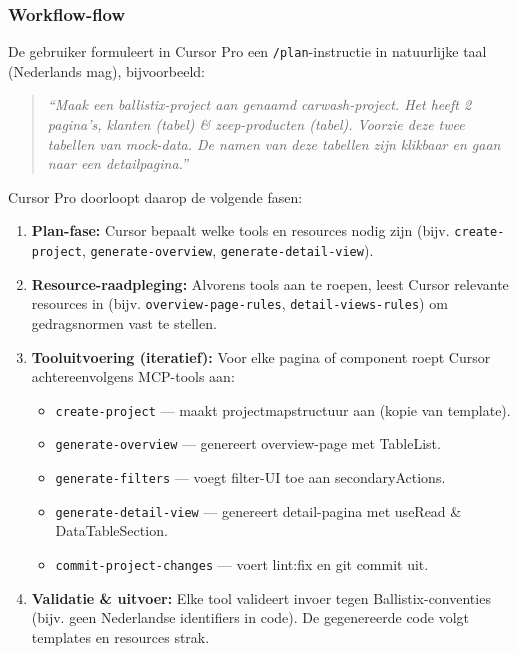 \subsubsection{Workflow-flow}

De gebruiker formuleert in Cursor Pro een \texttt{/plan}-instructie in natuurlijke taal (Nederlands mag), bijvoorbeeld:

\begin{quote}
\textit{``Maak een ballistix-project aan genaamd carwash-project. Het heeft 2 pagina's, klanten (tabel) \& zeep-producten (tabel). Voorzie deze twee tabellen van mock-data. De namen van deze tabellen zijn klikbaar en gaan naar een detailpagina.''}
\end{quote}

Cursor Pro doorloopt daarop de volgende fasen:

\begin{enumerate}
  \item \textbf{Plan-fase:} Cursor bepaalt welke tools en resources nodig zijn (bijv. \texttt{create-project}, \texttt{generate-overview}, \texttt{generate-detail-view}).
  \item \textbf{Resource-raadpleging:} Alvorens tools aan te roepen, leest Cursor relevante resources in (bijv. \texttt{overview-page-rules}, \texttt{detail-views-rules}) om gedragsnormen vast te stellen.
  \item \textbf{Tooluitvoering (iteratief):} Voor elke pagina of component roept Cursor achtereenvolgens MCP-tools aan:
    \begin{itemize}
      \item \texttt{create-project} — maakt projectmapstructuur aan (kopie van template).
      \item \texttt{generate-overview} — genereert overview-page met TableList.
      \item \texttt{generate-filters} — voegt filter-UI toe aan secondaryActions.
      \item \texttt{generate-detail-view} — genereert detail-pagina met useRead \& DataTableSection.
      \item \texttt{commit-project-changes} — voert lint:fix en git commit uit.
    \end{itemize}
  \item \textbf{Validatie \& uitvoer:} Elke tool valideert invoer tegen Ballistix-conventies (bijv. geen Nederlandse identifiers in code). De gegenereerde code volgt templates en resources strak.
\end{enumerate}

